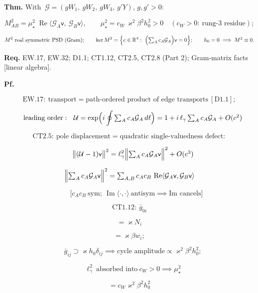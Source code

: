 \begin{theorem}\label{tag:EW-33}
\textbf{Thm.} With $\ \mathcal G=(gW_1,\ gW_2,\ gW_3,\ g'Y)$, $g,g'>0$:

\[
M^2_{AB}=\mu_\star^2\;\operatorname{Re}\bigl\langle\mathcal G_A\mathsf v,\ \mathcal G_B\mathsf v\bigr\rangle,\qquad
\mu_\star^2=c_W\,\varkappa^2\beta^2h_0^2>0\quad(c_W>0:\ \text{rung-3 residue});
\]

\[
M^2\ \text{real symmetric PSD (Gram)};\qquad
\ker M^2=\Bigl\{c\in\mathbb R^4:\ \Bigl(\textstyle\sum_Ac_A\mathcal G_A\Bigr)\mathsf v=0\Bigr\};\qquad
h_0=0\implies M^2\equiv0 .
\]

\textbf{Req.} EW.17, EW.32; D1.1; CT1.12, CT2.5, CT2.8 (Part 2); Gram-matrix facts [linear algebra].

\textbf{Pf.}

\[
\mathrm{EW.17}:\ \text{transport}=\text{path-ordered product of edge transports}\ [\mathrm{D1.1}];
\]

\[
\quad \text{leading order}:\ \ \mathcal U=\exp\Bigl(i\oint\textstyle\sum_Ac_A\mathcal G_A\,d\ell\Bigr)=1+i\,\ell_\gamma\textstyle\sum_Ac_A\mathcal G_A+O(c^2)
\]

\[
\mathrm{CT2.5}:\ \text{pole displacement}=\text{quadratic single-valuedness defect}:
\]

\[
\quad \bigl\|(\mathcal U-1)\mathsf v\bigr\|^2=\ell_\gamma^2\Bigl\|\textstyle\sum_Ac_A\mathcal G_A\mathsf v\Bigr\|^2+O(c^3)
\]

\[
\Bigl\|\textstyle\sum_Ac_A\mathcal G_A\mathsf v\Bigr\|^2=\sum_{A,B}c_Ac_B\,\operatorname{Re}\langle\mathcal G_A\mathsf v,\mathcal G_B\mathsf v\rangle
\]

\[
\qquad \bigl[c_Ac_B\ \text{sym};\ \operatorname{Im}\langle\cdot,\cdot\rangle\ \text{antisym}\implies\text{Im cancels}\bigr]
\]

\[
\mathrm{CT1.12}:\ \bar g_{0i}
\]

\[
= \varkappa N_i
\]

\[
= \varkappa\beta w_i;
\]

\[
\quad\bar g_{ij}\supset\varkappa h_0\delta_{ij}\implies\text{cycle amplitude}\propto\varkappa^2\beta^2h_0^2;
\]

\[
\quad\ell_\gamma^2\ \text{absorbed into}\ c_W>0\implies\mu_\star^2
\]

\[
= c_W\varkappa^2\beta^2h_0^2
\]


\end{theorem}
